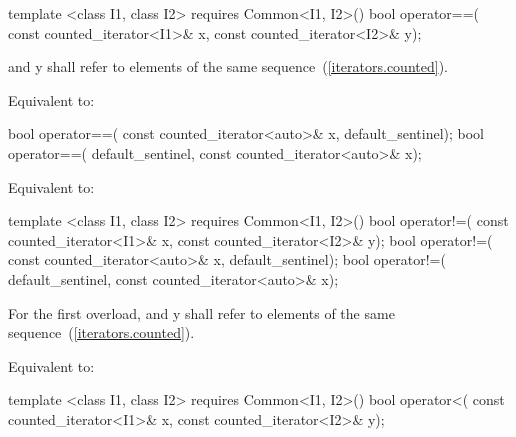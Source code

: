 %
%
\begin{itemdecl}
template <class I1, class I2>
    requires Common<I1, I2>()
  bool operator==(
    const counted_iterator<I1>& x, const counted_iterator<I2>& y);
\end{itemdecl}

\begin{itemdescr}
\pnum
\requires {} and {y} shall refer to elements of the same
sequence~(\ref{iterators.counted}).

\pnum
\effects Equivalent to:
\end{itemdescr}

\begin{itemdecl}
  bool operator==(
    const counted_iterator<auto>& x, default_sentinel);
  bool operator==(
    default_sentinel, const counted_iterator<auto>& x);
\end{itemdecl}

\begin{itemdescr}
\pnum
\effects Equivalent to:
\end{itemdescr}

%
%
\begin{itemdecl}
template <class I1, class I2>
    requires Common<I1, I2>()
  bool operator!=(
    const counted_iterator<I1>& x, const counted_iterator<I2>& y);
  bool operator!=(
    const counted_iterator<auto>& x, default_sentinel);
  bool operator!=(
    default_sentinel, const counted_iterator<auto>& x);
\end{itemdecl}

\begin{itemdescr}
\pnum
\requires For the first overload,  and {y} shall refer to
elements of the same sequence~(\ref{iterators.counted}).

\pnum
\effects Equivalent to:
\end{itemdescr}

%
%
\begin{itemdecl}
template <class I1, class I2>
    requires Common<I1, I2>()
  bool operator<(
    const counted_iterator<I1>& x, const counted_iterator<I2>& y);
\end{itemdecl}


